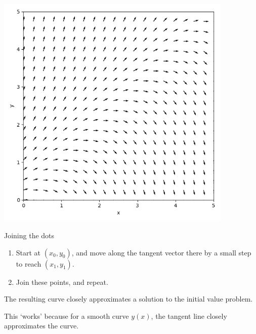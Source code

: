 \documentclass{beamer}
\begin{document}
    \begin{frame}[plain]
        \begin{center}
            \includegraphics[width=0.85\textwidth]{./img/directionfield.png}
        \end{center}
    \end{frame}
    
    \begin{frame}{Joining the dots}
        \begin{enumerate}
            \item Start at $(x_0, y_0)$, and move along the tangent vector there by a
            small step to reach $(x_1, y_1)$.
            \item Join these points, and repeat.
        \end{enumerate}

        The resulting curve closely approximates a solution to the initial value
        problem.

        This `works' because for a smooth curve $y(x)$, the tangent line closely
        approximates the curve.
    \end{frame}
\end{document}
